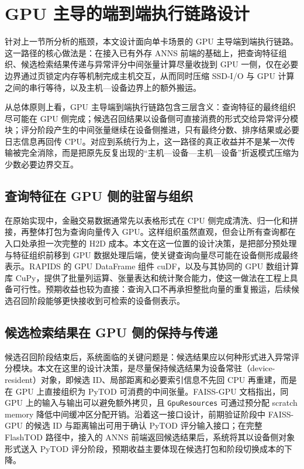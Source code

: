 \section{GPU 主导的端到端执行链路设计}

针对上一节所分析的瓶颈，本文设计面向单卡场景的 GPU 主导端到端执行链路。这一路径的核心做法是：在接入已有外存 ANNS 前端的基础上，把查询特征组织、候选检索结果传递与异常评分中间张量计算尽量收拢到 GPU 一侧，仅在必要边界通过页锁定内存等机制完成主机交互，从而同时压缩 SSD-I/O 与 GPU 计算之间的串行等待，以及主机---设备边界上的额外搬运。

从总体原则上看，GPU 主导端到端执行链路包含三层含义：查询特征的最终组织尽可能在 GPU 侧完成；候选召回结果以设备侧可直接消费的形式交给异常评分模块；评分阶段产生的中间张量继续在设备侧推进，只有最终分数、排序结果或必要日志信息再回传 CPU。对应到系统行为上，这一路径的真正收益并不是某一次传输被完全消除，而是把原先反复出现的``主机---设备---主机---设备''折返模式压缩为少数必要边界交互。

\subsection{查询特征在 GPU 侧的驻留与组织}

在原始实现中，金融交易数据通常先以表格形式在 CPU 侧完成清洗、归一化和拼接，再整体打包为查询向量传入 GPU。这样组织虽然直观，但会让所有查询都在入口处承担一次完整的 H2D 成本。本文在这一位置的设计决策，是把部分预处理与特征组织前移到 GPU 数据处理后端，使关键查询向量尽可能在设备侧形成最终表示。RAPIDS 的 GPU DataFrame 组件 cuDF，以及与其协同的 GPU 数组计算库 CuPy，提供了批量列运算、张量表达和统计聚合能力，使这一做法在工程上具备可行性\citep{rapids_cudf_pandas}。预期收益也较为直接：查询入口不再承担整批向量的重复搬运，后续候选召回阶段能够更快接收到可检索的设备侧表示。

\subsection{候选检索结果在 GPU 侧的保持与传递}

候选召回阶段结束后，系统面临的关键问题是：候选结果应以何种形式进入异常评分模块。本文在这里的设计决策，是尽量保持候选结果为设备常驻（device-resident）对象，即候选 ID、局部距离和必要索引信息不先回 CPU 再重建，而是在 GPU 上直接组织为 PyTOD 可消费的中间张量。FAISS-GPU 文档指出，同 GPU 上的输入与输出可以避免额外拷贝，且 \texttt{GpuResources} 可通过预分配 scratch memory 降低中间缓冲区分配开销\citep{faiss_gpu_wiki}。沿着这一接口设计，前期验证阶段中 FAISS-GPU 的候选 ID 与距离输出可用于确认 PyTOD 评分输入接口；在完整 FlashTOD 路径中，接入的 ANNS 前端返回候选结果后，系统将其以设备侧对象形式送入 PyTOD 评分阶段，预期收益主要体现在候选打包和阶段切换成本的下降。

